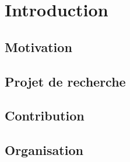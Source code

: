 \chapter{Introduction}

\section{Motivation}

\section{Projet de recherche}

\section{Contribution}

\section{Organisation}
